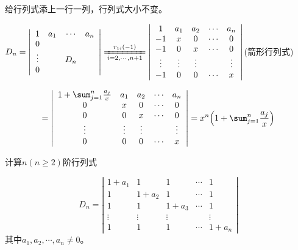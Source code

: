 \begin{solution}
    给行列式添上一行一列，行列式大小不变。

$ D_{n}=\left|\begin{array}{ccccccc}
        1      & a_{1} & \cdots & a_{n} \\
        0      &       &        &       \\
        \vdots &       & D_{n}  &       \\
        0      &       &        &
    \end{array}\right|
    \xlongequal[i=2,\cdots,n+1]{r_{1i}(-1)}
    \left|\begin{array}{ccccccc}
        1      & a_{1}  & a_{2}  & \cdots & a_{n}  \\
        -1     & x      & 0      & \cdots & 0      \\
        -1     & 0      & x      & \cdots & 0      \\
        \vdots & \vdots & \vdots &        & \vdots \\
        -1     & 0      & 0      & \cdots & x
    \end{array}\right|$(箭形行列式)

$$=\left|\begin{array}{ccccccc}
        1+\sum_{j=1}^{n}\frac{a_{j}}{x} & a_{1}  & a_{2}  & \cdots & a_{n}  \\
        0                               & x      & 0      & \cdots & 0      \\
        0                               & 0      & x      & \cdots & 0      \\
        \vdots                          & \vdots & \vdots &        & \vdots \\
        0                               & 0      & 0      & \cdots & x
    \end{array}\right|=x^{n}\qty(1+\sum_{j=1}^{n}\frac{a_{j}}{x})
$$
\end{solution}

\begin{example}
    计算$n(n\ge 2)$阶行列式

$$D_{n}=\left|\begin{array}{ccccccc}
        1+a_{1} & 1       & 1       & \cdots & 1       \\
        1       & 1+a_{2} & 1       & \cdots & 1       \\
        1       & 1       & 1+a_{3} & \cdots & 1       \\
        \vdots  & \vdots  & \vdots  &        & \vdots  \\
        1       & 1       & 1       & \cdots & 1+a_{n}
    \end{array}\right|$$
其中$a_{1},a_{2},\cdots,a_{n} \neq 0$。
\end{example}

